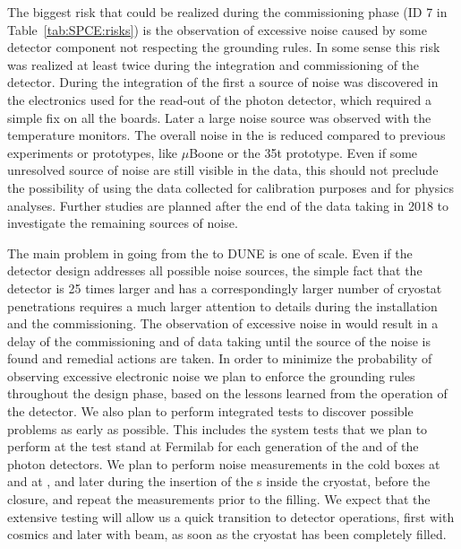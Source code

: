 The biggest risk that could be realized during the commissioning phase
(ID 7 in Table~\ref{tab:SPCE:risks}) is the observation of excessive noise 
caused by some detector component not respecting the  grounding
rules. In some sense this risk was realized at least twice during the 
integration and commissioning of the  detector. During the 
integration of the first  a source of noise was discovered 
in the electronics used for the read-out of the photon  detector, which 
required a simple fix on all the boards. Later a large noise source was 
observed with the temperature monitors. The overall noise in the  
is reduced compared to previous  experiments or prototypes, 
like $\mu$Boone or the 35t prototype. Even if some unresolved source of noise 
are still visible in the  data, this should not preclude the 
possibility of using the data collected for calibration purposes and for 
physics analyses. Further studies are planned after the end of the 
data taking in 2018 to investigate the remaining sources of noise.

The main problem in going from the  to DUNE is one of scale.
Even if the detector design addresses all possible noise sources, the simple
fact that the detector is 25 times larger and has a correspondingly larger
number of cryostat penetrations requires a much larger attention to details
during the installation and the commissioning. The observation of excessive 
noise in  would result in a delay of the commissioning and of 
data taking until the source of the noise is found and remedial actions 
are taken. In order to minimize the probability of observing excessive 
electronic noise we plan to enforce the grounding  rules throughout the 
design phase, based on the lessons learned from the operation of the 
 detector. We also plan to perform  integrated tests to discover 
possible problems as early as possible. This includes the system tests that 
we plan to perform at the  test stand at Fermilab for each generation 
of the  and of the photon detectors. We plan to perform noise 
measurements in the cold boxes at  and at \surf, and later 
during the insertion of the s inside the cryostat, before the 
 closure, and repeat the measurements prior to the  filling. 
We expect that the extensive testing will allow us a quick transition to 
detector operations, first with cosmics and later with beam, as soon as the 
cryostat has been completely filled. 

